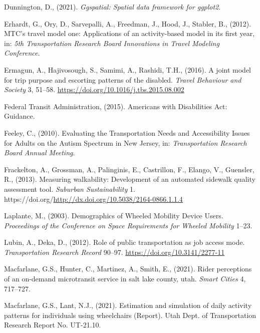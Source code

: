 \documentclass[3p, authoryear, review]{elsarticle} %
\newlength{\cslhangindent}
\newenvironment{CSLReferences}[2] %
 {%
  \setlength{\parindent}{0pt}
  \ifodd #1 \everypar{\setlength{\hangindent}{\cslhangindent}}\ignorespaces\fi
  \ifnum #2 > 0
  \setlength{\parskip}{#2\baselineskip}
  \fi
 }%
 {}
\begin{document}
\begin{CSLReferences}{1}{0}
\leavevmode{}%
Dunnington, D., (2021). \emph{Ggspatial: Spatial data framework for ggplot2}.

\leavevmode{}%
Erhardt, G., Ory, D., Sarvepalli, A., Freedman, J., Hood, J., Stabler, B., (2012). MTC's travel model one: Applications of an activity-based model in its first year, in: \emph{5th Transportation Research Board Innovations in Travel Modeling Conference}.

\leavevmode{}%
Ermagun, A., Hajivosough, S., Samimi, A., Rashidi, T.H., (2016). {A joint model for trip purpose and escorting patterns of the disabled}. \emph{Travel Behaviour and Society} 3, 51--58. \url{https://doi.org/10.1016/j.tbs.2015.08.002}

\leavevmode{}%
Federal Transit Administration, (2015). {Americans with Disabilities Act: Guidance}.

\leavevmode{}%
Feeley, C., (2010). {Evaluating the Transportation Needs and Accessibility Issues for Adults on the Autism Spectrum in New Jersey}, in: \emph{{Transportation Research Board Annual Meeting}}.

\leavevmode{}%
Frackelton, A., Grossman, A., Palinginis, E., Castrillon, F., Elango, V., Guensler, R., (2013). Measuring walkability: Development of an automated sidewalk quality assessment tool. \emph{Suburban Sustainability} 1. https://doi.org/\url{http://dx.doi.org/10.5038/2164-0866.1.1.4}

\leavevmode{}%
Laplante, M., (2003). {Demographics of Wheeled Mobility Device Users}. \emph{Proceedings of the Conference on Space Requirements for Wheeled Mobility} 1--23.

\leavevmode{}%
Lubin, A., Deka, D., (2012). {Role of public transportation as job access mode}. \emph{Transportation Research Record} 90--97. \url{https://doi.org/10.3141/2277-11}

\leavevmode{}%
Macfarlane, G.S., Hunter, C., Martinez, A., Smith, E., (2021). Rider perceptions of an on-demand microtransit service in salt lake county, utah. \emph{Smart Cities} 4, 717--727.

\leavevmode{}%
Macfarlane, G.S., Lant, N.J., (2021). Estimation and simulation of daily activity patterns for individuals using wheelchairs (Report). Utah Dept. of Transportation Research Report No. UT-21.10.


\end{CSLReferences}
\end{document}
